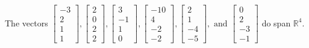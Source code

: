 \begin{exercise}
\begin{exerciseStatement}
  \end{exerciseStatement}
  \begin{exerciseAnswer}
   The vectors \(\left[\begin{array}{r}
-3 \\
2 \\
1 \\
1
\end{array}\right] , \left[\begin{array}{r}
2 \\
0 \\
2 \\
2
\end{array}\right] , \left[\begin{array}{r}
3 \\
-1 \\
1 \\
0
\end{array}\right] , \left[\begin{array}{r}
-10 \\
4 \\
-2 \\
-2
\end{array}\right] , \left[\begin{array}{r}
2 \\
1 \\
-4 \\
-5
\end{array}\right] , \text{ and } \left[\begin{array}{r}
0 \\
2 \\
-3 \\
-1
\end{array}\right]\) 
  	 do  
	span \(\mathbb{R}^4\).
  


  \end{exerciseAnswer}
\end{exercise}